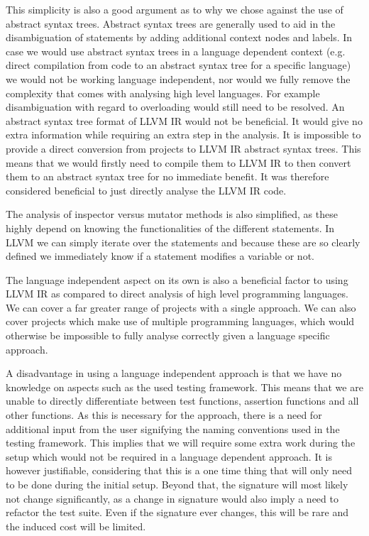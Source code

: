 \documentclass[11pt]{article}
\begin{document}
\begin{multicols}{2}
This simplicity is also a good argument as to why we chose against the use of abstract syntax trees. Abstract syntax trees are generally used to aid in the disambiguation of statements by adding additional context nodes and labels. In case we would use abstract syntax trees in a language dependent context (e.g. direct compilation from code to an abstract syntax tree for a specific language) we would not be working language independent, nor would we fully remove the complexity that comes with analysing high level languages. For example disambiguation with regard to overloading would still need to be resolved. An abstract syntax tree format of LLVM IR would not be beneficial. It would give no extra information while requiring an extra step in the analysis. It is impossible to provide a direct conversion from projects to LLVM IR abstract syntax trees. This means that we would firstly need to compile them to LLVM IR to then convert them to an abstract syntax tree for no immediate benefit. It was therefore considered beneficial to just directly analyse the LLVM IR code.

The analysis of inspector versus mutator methods is also simplified, as these highly depend on knowing the functionalities of the different statements. In LLVM we can simply iterate over the statements and because these are so clearly defined we immediately know if a statement modifies a variable or not.

The language independent aspect on its own is also a beneficial factor to using LLVM IR as compared to direct analysis of high level programming languages. We can cover a far greater range of projects with a single approach. We can also cover projects which make use of multiple programming languages, which would otherwise be impossible to fully analyse correctly given a language specific approach.

A disadvantage in using a language independent approach is that we have no knowledge on aspects such as the used testing framework. This means that we are unable to directly differentiate between test functions, assertion functions and all other functions. As this is necessary for the approach, there is a need for additional input from the user signifying the naming conventions used in the testing framework. This implies that we will require some extra work during the setup which would not be required in a language dependent approach. It is however justifiable, considering that this is a one time thing that will only need to be done during the initial setup. Beyond that, the signature will most likely not change significantly, as a change in signature would also imply a need to refactor the test suite. Even if the signature ever changes, this will be rare and the induced cost will be limited.



\end{multicols}
\end{document}
